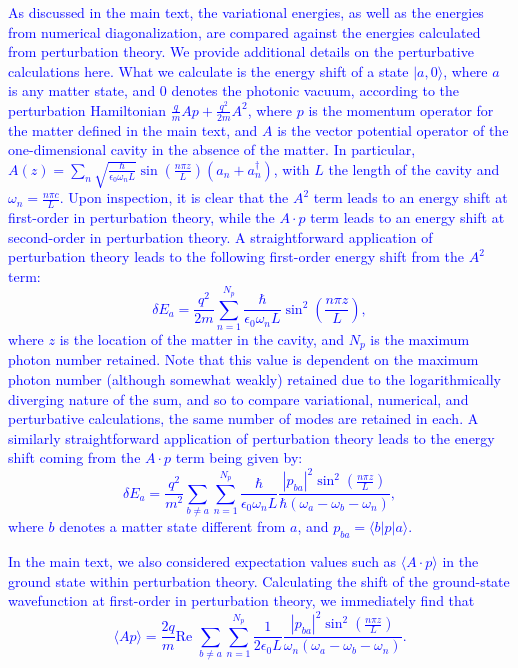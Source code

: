 \documentclass[aps,prb,onecolumn,preprint,
	groupedaddress,superscriptaddress,
	amsfonts,amssymb,amsmath,floatfix,
	citeautoscript]{revtex4-1}
\begin{document}
\textcolor{blue}{As discussed in the main text, the variational energies, as well as the energies from numerical diagonalization, are compared against the energies calculated from perturbation theory. We provide additional details on the perturbative calculations here. What we calculate is the energy shift of a state $|a,0\rangle$, where $a$ is any matter state, and $0$ denotes the photonic vacuum, according to the perturbation Hamiltonian $\frac{q}{m}Ap + \frac{q^2}{2m}A^2$, where $p$ is the momentum operator for the matter defined in the main text, and $A$ is the vector potential operator of the one-dimensional cavity in the absence of the matter. In particular, $A(z) = \sum_n\sqrt{\frac{\hbar}{\epsilon_0\omega_n L}}\sin\left(\frac{n\pi z}{L} \right) \left(a_n+a^{\dagger}_n\right)$, with $L$ the length of the cavity and $\omega_n = \frac{n\pi c}{L}$. Upon inspection, it is clear that the $A^2$ term leads to an energy shift at first-order in perturbation theory, while the $A\cdot p$ term leads to an energy shift at second-order in perturbation theory. A straightforward application of perturbation theory leads to the following first-order energy shift from the $A^2$ term:
\begin{equation}
\delta E_a = \frac{q^2}{2m}\sum\limits_{n=1}^{N_p} \frac{\hbar}{\epsilon_0\omega_n L}\sin^2\left(\frac{n\pi z}{L}\right),
\end{equation}
where $z$ is the location of the matter in the cavity, and $N_p$ is the maximum photon number retained. Note that this value is dependent on the maximum photon number (although somewhat weakly) retained due to the logarithmically diverging nature of the sum, and so to compare variational, numerical, and perturbative calculations, the same number of modes are retained in each. A similarly straightforward application of perturbation theory leads to the energy shift coming from the $A\cdot p$ term being given by:
\begin{equation}
\delta E_a = \frac{q^2}{m^2}\sum\limits_{b\neq a}\sum\limits_{n=1}^{N_p} \frac{\hbar}{\epsilon_0\omega_n L} \frac{|p_{ba}|^2\sin^2\left(\frac{n\pi z}{L} \right)}{\hbar(\omega_a - \omega_b - \omega_n)},
\end{equation}
where $b$ denotes a matter state different from $a$, and $p_{ba} = \langle b|p|a\rangle$.}

\textcolor{blue}{In the main text, we also considered expectation values such as $\langle A \cdot p \rangle$ in the ground state within perturbation theory. Calculating the shift of the ground-state wavefunction at first-order in perturbation theory, we immediately find that
\begin{equation}
\langle Ap \rangle = \frac{2q}{m} \text{Re } \sum\limits_{b\neq a}\sum\limits_{n=1}^{N_p} \frac{1}{2\epsilon_0L}\frac{|p_{ba}|^2\sin^2\left(\frac{n\pi z}{L}\right)}{\omega_n(\omega_a-\omega_b-\omega_n)}.
\end{equation}}
\end{document}
